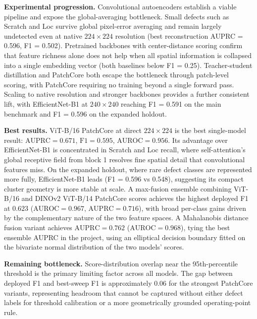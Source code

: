 \documentclass[11pt]{article}
\begin{document}
\textbf{Experimental progression.} Convolutional autoencoders establish a viable pipeline and expose the
global-averaging bottleneck. Small defects such as Scratch and Loc survive global pixel-error averaging
and remain largely undetected even at native $224\!\times\!224$ resolution (best reconstruction AUPRC = 0.596, F1 = 0.502).
Pretrained backbones with center-distance scoring confirm that feature richness alone does not help when
all spatial information is collapsed into a single embedding vector (both baselines below F1 = 0.25).
Teacher-student distillation and PatchCore both escape the bottleneck through patch-level scoring,
with PatchCore requiring no training beyond a single forward pass. Scaling to native resolution and
stronger backbones provides a further consistent lift, with EfficientNet-B1 at $240\!\times\!240$
reaching F1 = 0.591 on the main benchmark and F1 = 0.596 on the expanded holdout.

\textbf{Best results.} ViT-B/16 PatchCore at direct $224\!\times\!224$ is the best single-model result:
$\mathrm{AUPRC}=0.671$, $\mathrm{F1}=0.595$, $\mathrm{AUROC}=0.956$. Its advantage over
EfficientNet-B1 is concentrated in Scratch and Loc recall, where self-attention's global receptive field
from block 1 resolves fine spatial detail that convolutional features miss. On the expanded holdout, where
rare defect classes are represented more fully, EfficientNet-B1 leads (F1 = 0.596 vs 0.548), suggesting
its compact cluster geometry is more stable at scale.
A max-fusion ensemble combining ViT-B/16 and DINOv2 ViT-B/14 PatchCore scores achieves the highest
deployed F1 at $0.623$ ($\mathrm{AUROC}=0.967$, $\mathrm{AUPRC}=0.716$), with broad per-class gains driven by
the complementary nature of the two feature spaces. A Mahalanobis distance fusion variant achieves $\mathrm{AUPRC}=0.762$ ($\mathrm{AUROC}=0.968$),
tying the best ensemble AUPRC in the project, using an elliptical decision boundary
fitted on the bivariate normal distribution of the two models' scores.

\textbf{Remaining bottleneck.} Score-distribution overlap near the 95th-percentile threshold is the primary
limiting factor across all models. The gap between deployed F1 and best-sweep F1 is approximately 0.06
for the strongest PatchCore variants, representing headroom that cannot be captured without either defect
labels for threshold calibration or a more geometrically grounded operating-point rule.
\end{document}
